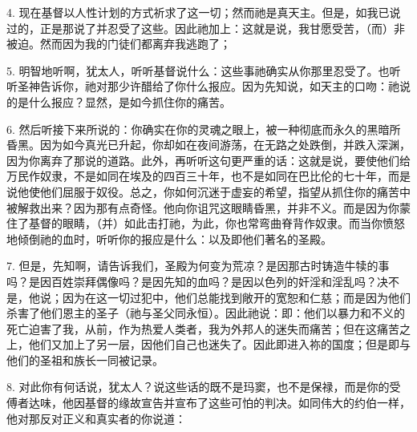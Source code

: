 4. 现在基督以人性计划的方式祈求了这一切；然而祂是真天主。但是，如我已说过的，正是那说了并忍受了这些。因此祂加上：这就是说，我甘愿受苦，（而）非被迫。然而因为我的门徒们都离弃我逃跑了；\par

5. 明智地听啊，犹太人，听听基督说什么：这些事祂确实从你那里忍受了。也听听圣神告诉你，祂对那少许醋给了你什么报应。因为先知说，如天主的口吻：祂说的是什么报应？显然，是如今抓住你的痛苦。\par

6. 然后听接下来所说的：你确实在你的灵魂之眼上，被一种彻底而永久的黑暗所昏黑。因为如今真光已升起，你却如在夜间游荡，在无路之处跌倒，并跌入深渊，因为你离弃了那说的道路。此外，再听听这句更严重的话：这就是说，要使他们给万民作奴隶，不是如同在埃及的四百三十年，也不是如同在巴比伦的七十年，而是说他使他们屈服于奴役。总之，你如何沉迷于虚妄的希望，指望从抓住你的痛苦中被解救出来？因为那有点奇怪。他向你诅咒这眼睛昏黑，并非不义。而是因为你蒙住了基督的眼睛，（并）如此击打祂，为此，你也常弯曲脊背作奴隶。而当你愤怒地倾倒祂的血时，听听你的报应是什么：以及即他们著名的圣殿。\par

7. 但是，先知啊，请告诉我们，圣殿为何变为荒凉？是因那古时铸造牛犊的事吗？是因百姓崇拜偶像吗？是因先知的血吗？是因以色列的奸淫和淫乱吗？决不是，他说；因为在这一切过犯中，他们总能找到敞开的宽恕和仁慈；而是因为他们杀害了他们恩主的圣子（祂与圣父同永恒）。因此祂说：即：他们以暴力和不义的死亡迫害了我，从前，作为热爱人类者，我为外邦人的迷失而痛苦；但在这痛苦之上，他们又加上了另一层，因他们自己也迷失了。因此即进入祢的国度；但是即与他们的圣祖和族长一同被记录。\par

8. 对此你有何话说，犹太人？说这些话的既不是玛窦，也不是保禄，而是你的受傅者达味，他因基督的缘故宣告并宣布了这些可怕的判决。如同伟大的约伯一样，他对那反对正义和真实者的你说道：\par

